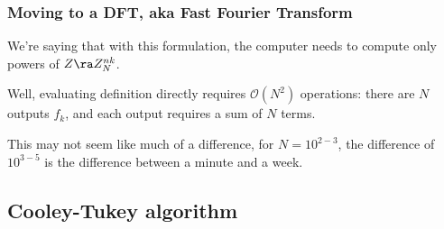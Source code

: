 \documentclass[hyperref={colorlinks=true}]{beamer}
\begin{document}

\begin{frame}%
  \frametitle{Moving to a  DFT, aka Fast Fourier Transform}

  We're saying that with this formulation, the computer needs to compute only powers of $Z \ra Z_{N}^{nk}$. 
  
  \mysp
  
  \begin{center}  \end{center}
  
  \pause
  
  \mysp
  
  Well, evaluating  definition directly requires $\mathcal{O}(N^2)$ operations: there are $N$ outputs $f_k$, and each output requires a sum of $N$ terms. 
  
  \pause
  
  \mysp
  
  \begin{center}  \end{center}
  
  \pause
  
  \mysp
  
  This may not seem like much of a difference, for $N = 10^{2-3}$, the difference of $10^{3-5}$ is the difference between a minute and a week. 
  
  \begin{center}  \end{center}

\end{frame}

\subsection[Cooley-Tukey algorithm]{Cooley-Tukey algorithm}
\end{document}
